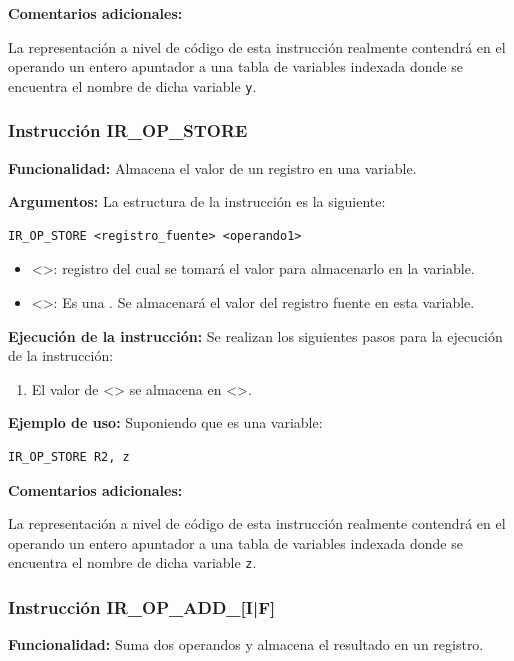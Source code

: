 \noindent
\textbf{Comentarios adicionales:}

La representación a nivel de código de esta instrucción realmente contendrá en el operando un entero apuntador a una tabla de variables indexada donde se encuentra el nombre de dicha variable \texttt{y}.

\subsubsection{Instrucción IR\_OP\_STORE}\label{subsubsec:IR_OP_STORE}
\noindent
\textbf{Funcionalidad:} Almacena el valor de un registro en una variable.

\noindent
\textbf{Argumentos:} La estructura de la instrucción es la siguiente:

\begin{verbatim}
IR_OP_STORE <registro_fuente> <operando1>
\end{verbatim}
\begin{itemize}
    \item <>: registro del cual se tomará el valor para almacenarlo en la variable.
    \item <>: Es una . Se almacenará el valor del registro fuente en esta variable.
\end{itemize}

\noindent
\textbf{Ejecución de la instrucción:}
\noindent
Se realizan los siguientes pasos para la ejecución de la instrucción:

\begin{enumerate}
    \item El valor de <> se almacena en <>.
\end{enumerate}

\noindent
\textbf{Ejemplo de uso:}
\noindent
Suponiendo que  es una variable:

\begin{verbatim}
IR_OP_STORE R2, z
\end{verbatim}

\noindent
\textbf{Comentarios adicionales:}

La representación a nivel de código de esta instrucción realmente contendrá en el operando un entero apuntador a una tabla de variables indexada donde se encuentra el nombre de dicha variable \texttt{z}.

\subsubsection{Instrucción IR\_OP\_ADD\_[I|F]}\label{subsubsec:IR_OP_ADD}
\noindent
\textbf{Funcionalidad:} Suma dos operandos y almacena el resultado en un registro.

